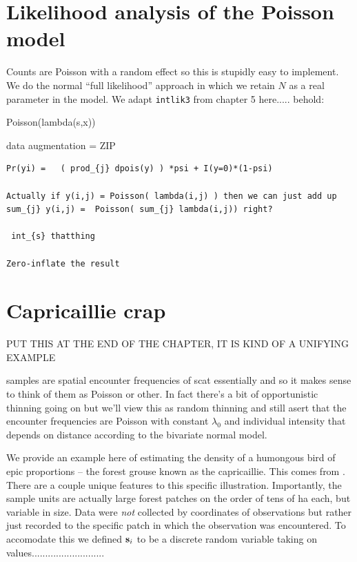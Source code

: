 {\section{Likelihood analysis of the Poisson model}

Counts are Poisson with a random effect so this is stupidly easy to
implement. 
We do the normal ``full likelihood'' approach in which we retain $N$
as a real parameter in the model. We adapt \mbox{\tt intlik3} from
chapter 5 here..... behold:

Poisson(lambda(s,x))

data augmentation = ZIP
\begin{verbatim}
Pr(yi) =   ( prod_{j} dpois(y) ) *psi + I(y=0)*(1-psi)

Actually if y(i,j) = Poisson( lambda(i,j) ) then we can just add up
sum_{j} y(i,j) =  Poisson( sum_{j} lambda(i,j)) right?

 int_{s} thatthing

Zero-inflate the result
\end{verbatim}







\section{Capricaillie crap}

PUT THIS AT THE END OF THE CHAPTER, IT IS KIND OF A UNIFYING EXAMPLE 

samples are spatial encounter frequencies of scat essentially and so
it makes sense to think of them as Poisson or other.
In fact there's a bit of opportunistic thinning going on but we'll view
this as random thinning and still asert that the encounter frequencies
are Poisson with constant $\lambda_{0}$ and individual intensity that
depends on distance according to the bivariate normal model. 

We provide an example here of estimating the density of a humongous
bird of epic proportions -- the forest grouse known as the
capricaillie. This comes from \citet{mollet_etal:2012}.
There are a couple unique features to this specific
illustration. Importantly, the sample units are actually large forest
patches on the order of tens of ha each, but variable in size. Data
were {\it not} collected by coordinates of observations but rather
just recorded to the specific patch in which the observation was
encountered. To accomodate this we defined ${\bf s}_{i}$ to be a
discrete
random variable taking on values...........................

}
